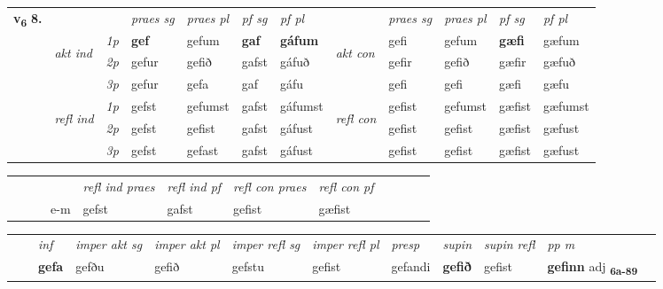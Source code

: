 \begin{tabular}{llllllllllll} \toprule
\multirow{4}{*}{{{\textbf{v{\textsubscript{6}}} \Large{\textbf{8.}}}}}  & &   &  \textit{praes sg}  & \textit{praes pl}  &\textit{ pf sg} & \textit{pf pl} &  &  \textit{praes sg}  & \textit{praes pl}  & \textit{pf sg} & \textit{pf pl } \\*
	\cmidrule{4-7} \cmidrule{9-12}
 & \multirow{3}{*}{\begin{turn}{90}\textit{akt ind}\end{turn}} & {\textit{1p}} & \textbf{gef} & gefum    & \textbf{gaf} & \textbf{gáfum} & \multirow{3}{*}{\begin{turn}{90}\textit{akt con}\end{turn}} &gefi & gefum & \textbf{gæfi} & gæfum\\*
& &  {\textit{2p}} &  gefur  & gefið   & gafst & gáfuð & & gefir & gefið & gæfir & gæfuð \\*
& &  {\textit{3p}} & gefur & gefa   & gaf & gáfu & & gefi & gefi& gæfi & gæfu  \\*
\cmidrule{4-7} \cmidrule{9-12}
 &\multirow{3}{*}{\begin{turn}{90}\textit{refl ind}\end{turn}} & {\textit{1p}} & gefst & gefumst    & gafst & gáfumst & \multirow{3}{*}{\begin{turn}{90}\textit{refl con}\end{turn}}  &gefist & gefumst & gæfist & gæfumst\\*
 &&  {\textit{2p}} &  gefst  & gefist   & gafst & gáfust & &gefist & gefist & gæfist & gæfust \\*
& &  {\textit{3p}} & gefst & gefast   & gafst & gáfust & & gefist & gefist& gæfist & gæfust  \\*
\cmidrule{4-7} \cmidrule{9-12}
\end{tabular}


\begin{tabular}{llllllllllll}
 & &  & &  \textit{refl ind praes} & \textit{refl ind pf} & \textit{refl con praes} & \textit{refl con pf} \\*
&  & & e-m & gefst & gafst & gefist & gæfist \\*
\cmidrule{5-9}
\end{tabular}


\begin{tabular}{llllllllllll}
 & & \textit{inf} & \textit{imper akt sg} & \textit{imper akt pl} & \textit{imper refl sg} & \textit{imper refl pl} & \textit{presp} & \textit{supin} & \textit{supin refl} & \textit{pp m}     \\*
  & & \textbf{gefa} & gefðu  & gefið & gefstu & gefist & gefandi &  \textbf{gefið} & gefist & \textbf{gefinn} adj \textbf{\textsubscript{6a-89}} \\*
\cmidrule{1-12}
\end{tabular}



